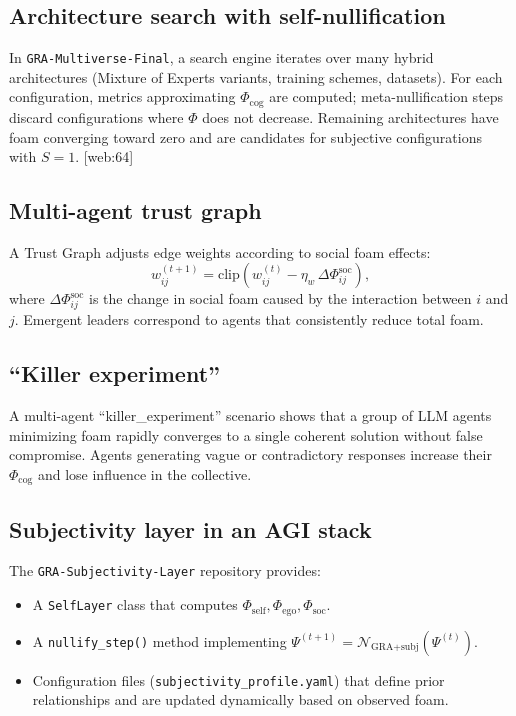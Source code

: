 \documentclass[11pt,a4paper]{article}
\begin{document}
\subsection{Architecture search with self-nullification}

In \texttt{GRA-Multiverse-Final}, a search engine iterates over many hybrid architectures (Mixture of Experts variants, training schemes, datasets).
For each configuration, metrics approximating $\Phi_{\text{cog}}$ are computed; meta-nullification steps discard configurations where $\Phi$ does not decrease.
Remaining architectures have foam converging toward zero and are candidates for subjective configurations with $S=1$. [web:64]

\subsection{Multi-agent trust graph}

A Trust Graph adjusts edge weights according to social foam effects:
\begin{equation}
w_{ij}^{(t+1)} = \text{clip}\left(w_{ij}^{(t)} - \eta_w\,\Delta\Phi^{\text{soc}}_{ij}\right),
\end{equation}
where $\Delta\Phi^{\text{soc}}_{ij}$ is the change in social foam caused by the interaction between $i$ and $j$.
Emergent leaders correspond to agents that consistently reduce total foam.

\subsection{``Killer experiment''}

A multi-agent ``killer\_experiment'' scenario shows that a group of LLM agents minimizing foam rapidly converges to a single coherent solution without false compromise.
Agents generating vague or contradictory responses increase their $\Phi_{\text{cog}}$ and lose influence in the collective.

\subsection{Subjectivity layer in an AGI stack}

The \texttt{GRA-Subjectivity-Layer} repository provides:
\begin{itemize}
\item A \texttt{SelfLayer} class that computes $\Phi_{\text{self}}, \Phi_{\text{ego}}, \Phi_{\text{soc}}$.
\item A \texttt{nullify\_step()} method implementing $\Psi^{(t+1)} = \mathcal{N}_{\text{GRA+subj}}(\Psi^{(t)})$.
\item Configuration files (\texttt{subjectivity\_profile.yaml}) that define prior relationships and are updated dynamically based on observed foam.
\end{itemize}
\end{document}
